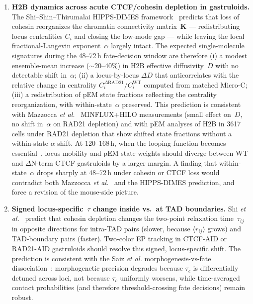 \documentclass[11pt]{article}
\begin{document}
\begin{enumerate}
  \item \textbf{H2B dynamics across acute CTCF/cohesin depletion in
        gastruloids.} The Shi--Shin--Thirumalai HIPPS-DIMES
        framework~\cite{Shi2025} predicts that loss of cohesin reorganizes
        the chromatin connectivity matrix~$\mathbf{K}$ --- redistributing
        locus centralities $C_i$ and closing the low-mode gap --- while
        leaving the local fractional-Langevin exponent~$\alpha$ largely
        intact. The expected single-molecule signatures during the
        48--72\,h fate-decision window are therefore (i) a modest
        ensemble-mean increase ($\sim$20--40\%) in H2B effective
        diffusivity~$D$ with no detectable shift in~$\alpha$; (ii) a
        locus-by-locus $\Delta D$ that anticorrelates with the relative
        change in centrality $C_i^{\Delta\mathrm{RAD21}}/C_i^{\mathrm{WT}}$
        computed from matched Micro-C; (iii) a redistribution of pEM
        state fractions reflecting the centrality reorganization, with
        within-state~$\alpha$ preserved. This prediction is consistent
        with Mazzocca \textit{et al.}~\cite{Mazzocca2024} MINFLUX+HILO
        measurements (small effect on~$D$, no shift in~$\alpha$ on RAD21
        depletion) and with pEM analyses of H2B in 3617 cells under RAD21
        depletion that show shifted state fractions without a within-state
        $\alpha$ shift. At 120--168\,h, when the looping function becomes
        essential~\cite{Saiz2026}, locus mobility and pEM state weights
        should diverge between WT and $\Delta$N-term CTCF gastruloids by a
        larger margin. A finding that within-state~$\alpha$ drops sharply
        at 48--72\,h under cohesin or CTCF loss would contradict both
        Mazzocca \textit{et al.}~\cite{Mazzocca2024} and the HIPPS-DIMES
        prediction, and force a revision of the mouse-side picture.

  \item \textbf{Signed locus-specific~$\tau$ change inside vs.\ at TAD
        boundaries.} Shi \textit{et al.}~\cite{Shi2025} predict that
        cohesin depletion changes the two-point relaxation
        time~$\tau_{ij}$ in opposite directions for intra-TAD pairs (slower,
        because $\langle r_{ij}\rangle$ grows) and TAD-boundary pairs
        (faster). Two-color EP tracking in CTCF-AID or RAD21-AID
        gastruloids should resolve this signed, locus-specific shift. The
        prediction is consistent with the Saiz \textit{et al.}
        morphogenesis-vs-fate dissociation~\cite{Saiz2026}: morphogenetic
        precision degrades because $\tau_c$ is differentially detuned
        across loci, not because $\tau_c$ uniformly worsens, while
        time-averaged contact probabilities (and therefore
        threshold-crossing fate decisions) remain robust.


\end{enumerate}
\end{document}
